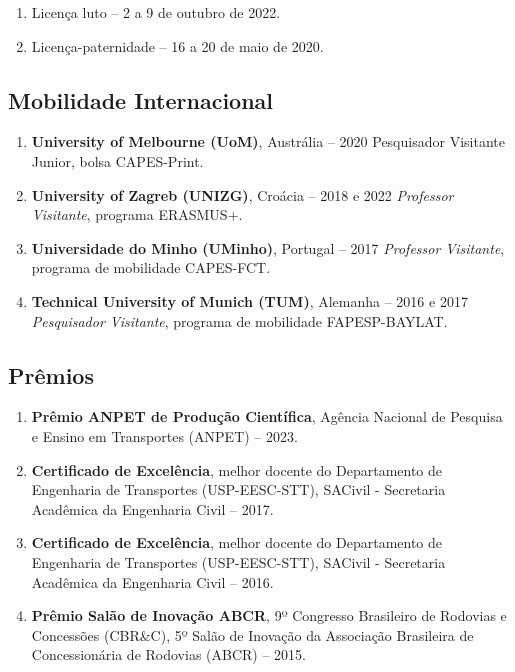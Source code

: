 \documentclass[
  brazilian,
  11pt,
  a4paper,
]{article}
\providecommand{\tightlist}{%
  \setlength{\itemsep}{0pt}\setlength{\parskip}{0pt}}
\begin{document}
\begin{enumerate}
\def\labelenumi{\arabic{enumi}.}
\tightlist
\item
  Licença luto -- 2 a 9 de outubro de 2022.
\item
  Licença-paternidade -- 16 a 20 de maio de 2020.
\end{enumerate}

\subsection{Mobilidade Internacional}\label{mobilidade-internacional}

\begin{enumerate}
\def\labelenumi{\arabic{enumi}.}
\item
  \textbf{University of Melbourne (UoM)}, Austrália -- 2020 Pesquisador
  Visitante Junior, bolsa CAPES-Print.
\item
  \textbf{University of Zagreb (UNIZG)}, Croácia -- 2018 e 2022
  \emph{Professor Visitante}, programa ERASMUS+.
\item
  \textbf{Universidade do Minho (UMinho)}, Portugal -- 2017
  \emph{Professor Visitante}, programa de mobilidade CAPES-FCT.
\item
  \textbf{Technical University of Munich (TUM)}, Alemanha -- 2016 e 2017
  \emph{Pesquisador Visitante}, programa de mobilidade FAPESP-BAYLAT.
\end{enumerate}

\subsection{Prêmios}\label{pruxeamios}

\begin{enumerate}
\def\labelenumi{\arabic{enumi}.}
\item
  \textbf{Prêmio ANPET de Produção Científica}, Agência Nacional de
  Pesquisa e Ensino em Transportes (ANPET) -- 2023.
\item
  \textbf{Certificado de Excelência}, melhor docente do Departamento de
  Engenharia de Transportes (USP-EESC-STT), SACivil - Secretaria
  Acadêmica da Engenharia Civil -- 2017.
\item
  \textbf{Certificado de Excelência}, melhor docente do Departamento de
  Engenharia de Transportes (USP-EESC-STT), SACivil - Secretaria
  Acadêmica da Engenharia Civil -- 2016.
\item
  \textbf{Prêmio Salão de Inovação ABCR}, 9º Congresso Brasileiro de
  Rodovias e Concessões (CBR\&C), 5º Salão de Inovação da Associação
  Brasileira de Concessionária de Rodovias (ABCR) -- 2015.
\end{enumerate}
\end{document}
